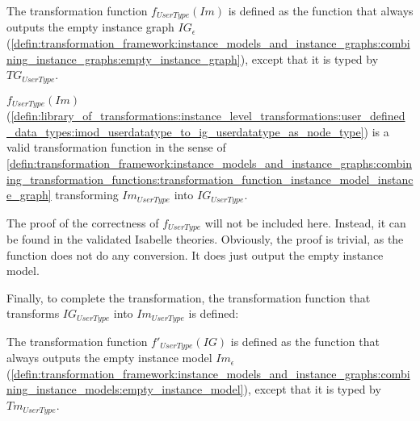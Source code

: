 \begin{defin}
\label{defin:library_of_transformations:instance_level_transformations:user_defined_data_types:imod_userdatatype_to_ig_userdatatype_as_node_type}
The transformation function $f_{UserType}(Im)$ is defined as the function that always outputs the empty instance graph $IG_\epsilon$ (\cref{defin:transformation_framework:instance_models_and_instance_graphs:combining_instance_graphs:empty_instance_graph}), except that it is typed by $TG_{UserType}$.
\end{defin}

\begin{thm}
\label{defin:library_of_transformations:instance_level_transformations:user_defined_data_types:imod_userdatatype_to_ig_userdatatype_as_node_type_func}
$f_{UserType}(Im)$ (\cref{defin:library_of_transformations:instance_level_transformations:user_defined_data_types:imod_userdatatype_to_ig_userdatatype_as_node_type}) is a valid transformation function in the sense of \cref{defin:transformation_framework:instance_models_and_instance_graphs:combining_transformation_functions:transformation_function_instance_model_instance_graph} transforming $Im_{UserType}$ into $IG_{UserType}$.
\end{thm}

The proof of the correctness of $f_{UserType}$ will not be included here. Instead, it can be found in the validated Isabelle theories. Obviously, the proof is trivial, as the function does not do any conversion. It does just output the empty instance model.

Finally, to complete the transformation, the transformation function that transforms $IG_{UserType}$ into $Im_{UserType}$ is defined:

\begin{defin}
\label{defin:library_of_transformations:instance_level_transformations:user_defined_data_types:ig_userdatatype_as_node_type_to_imod_userdatatype}
The transformation function $f'_{UserType}(IG)$ is defined as the function that always outputs the empty instance model $Im_\epsilon$ (\cref{defin:transformation_framework:instance_models_and_instance_graphs:combining_instance_models:empty_instance_model}), except that it is typed by $Tm_{UserType}$.
\end{defin}

